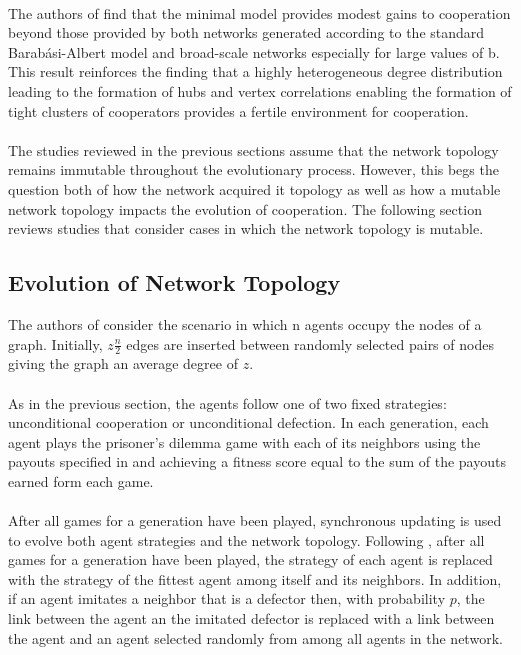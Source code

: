 \documentclass{article}
\begin{document}
	\paragraph{}The authors of \cite{Santos2006a} find that the minimal model provides modest gains to cooperation beyond those provided by both networks generated according to the standard Barabási-Albert model and broad-scale networks especially for large values of b.  This result reinforces the finding that a highly heterogeneous degree distribution leading to the formation of hubs and vertex correlations enabling the formation of tight clusters of cooperators provides a fertile environment for cooperation.
	\paragraph{}The studies reviewed in the previous sections assume that the network topology remains immutable throughout the evolutionary process.  However, this begs the question both of how the network acquired it topology as well as how a mutable network topology impacts the evolution of cooperation.  The following section reviews studies that consider cases in which the network topology is mutable.
	
	\subsection{Evolution of Network Topology}
	The authors of \cite{Eguiluz2005} consider the scenario in which n agents occupy the nodes of a graph.  Initially, $z\frac{n}{2}$ edges are inserted between randomly selected pairs of nodes giving the graph an average degree of $z$.
	\paragraph{}As in the previous section, the agents follow one of two fixed strategies: unconditional cooperation or unconditional defection.  In each generation, each agent plays the prisoner’s dilemma game with each of its neighbors using the payouts specified in \cite{Nowak1992} and achieving a fitness score equal to the sum of the payouts earned form each game.
	\paragraph{}After all games for a generation have been played, synchronous updating is used to evolve both agent strategies and the network topology.  Following \cite{Nowak1992}, after all games for a generation have been played, the strategy of each agent is replaced with the strategy of the fittest agent among itself and its neighbors.  In addition, if an agent imitates a neighbor that is a defector then, with probability $p$, the link between the agent an the imitated defector is replaced with a link between the agent and an agent selected randomly from among all agents in the network.
\end{document}
